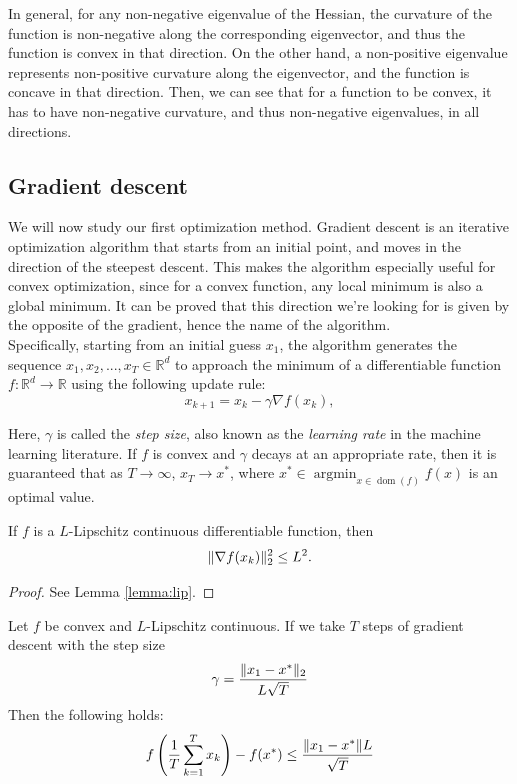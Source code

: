 \documentclass{article}
\DeclareMathOperator*{\argmin}{\arg\min}
\DeclareMathOperator*{\dom}{dom}
\newcommand{\R}{\mathbb{R}}
\DeclarePairedDelimiter{\norm}{\lVert}{\rVert}
\begin{document}
In general, for any non-negative eigenvalue of the Hessian, the curvature of the function is non-negative along the corresponding eigenvector, and thus the function is convex in that direction. On the other hand, a non-positive eigenvalue represents non-positive curvature along the eigenvector, and the function is concave in that direction. Then, we can see that for a function to be convex, it has to have non-negative curvature, and thus non-negative eigenvalues, in all directions.


\subsection{Gradient descent}

We will now study our first optimization method.
Gradient descent is an iterative optimization algorithm that starts from an initial point, and moves in the direction of the steepest descent. This makes the algorithm especially useful for convex optimization, since for a convex function, any local minimum is also a global minimum. It can be proved that this direction we're looking for is given by the opposite of the gradient, hence the name of the algorithm.\\

Specifically, starting from an initial guess $x_1$, the algorithm generates the sequence $x_1, x_2, ..., x_T \in \mathbb{R}^d$ to approach the minimum of a differentiable function $f:\R^d\to\R$ using the following update rule:
\[
x_{k+1} = x_k - \gamma \nabla f(x_k),
\]

Here, $\gamma$ is called the \emph{step size}, also known as the \emph{learning rate} in the machine learning literature.
If $f$ is convex and $\gamma$ decays at an appropriate rate, then it is guaranteed that as $T \to \infty$, $x_T \to x^\ast$, where $x^\ast \in \argmin_{x\in\dom(f)} f(x)$ is an optimal value.\\

\begin{lemma}
If $f$ is a $L$-Lipschitz continuous differentiable function, then
\[
\norm{\nabla f(x_k)}_2^2 \leq L^2.
\]
\label{lemma:lipschitz}
\end{lemma}
\begin{proof}
See Lemma \ref{lemma:lip}.
\end{proof}
\begin{thm}
Let $f$ be convex and $L$-Lipschitz continuous\footnotemark[6]. If we take $T$ steps of gradient descent with the step size
\[
\gamma = \frac{\norm{x_1 - x^\ast}_2}{L \sqrt{T}}
\]
Then the following holds:
\[
f\left(\frac{1}{T}\sum_{k=1}^T x_k\right) - f(x^\ast) \leq \frac{\norm{x_1 - x^\ast}L}{\sqrt{T}}
\]
\end{thm}
\end{document}
